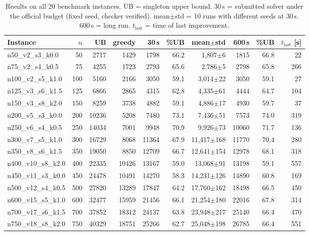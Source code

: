 \documentclass[10pt, a4paper]{article}
\begin{document}
\begin{table}[t]
\centering\footnotesize
\caption{Results on all 20 benchmark instances. UB = singleton upper bound.
30\,s = submitted solver under the official budget (fixed seed, checker
verified). mean$\pm$std = 10 runs with different seeds at 30\,s.
600\,s = long run. $t_{\text{last}}$ = time of last improvement.}
\label{tab:results}
\begin{tabular}{@{}lrrrrrrrrr@{}}
\toprule
Instance & $n$ & UB & greedy & 30\,s & \%UB & mean$\pm$std & 600\,s & \%UB & $t_{\text{last}}$ [s] \\
\midrule
n50\_v2\_s3\_k0.0    &   50 &  2717 &  1429 &  1798 & 66.2 & 1{,}807$\pm$6 &  1815 & 66.8 &  22 \\
n75\_v2\_s4\_k0.5    &   75 &  4255 &  1723 &  2793 & 65.6 & 2{,}786$\pm$5 &  2798 & 65.8 & 266 \\
n100\_v2\_s5\_k1.0   &  100 &  5160 &  2166 &  3050 & 59.1 & 3{,}014$\pm$22 &  3050 & 59.1 &  27 \\
n125\_v3\_s6\_k1.5   &  125 &  6866 &  2865 &  4315 & 62.8 & 4{,}335$\pm$61 &  4444 & 64.7 & 104 \\
n150\_v3\_s8\_k2.0   &  150 &  8259 &  3738 &  4882 & 59.1 & 4{,}886$\pm$17 &  4930 & 59.7 &  37 \\
n200\_v5\_s3\_k0.0   &  200 & 10236 &  5208 &  7480 & 73.1 & 7{,}436$\pm$51 &  7573 & 74.0 & 319 \\
n250\_v6\_s4\_k0.5   &  250 & 14034 &  7001 &  9948 & 70.9 & 9{,}926$\pm$73 & 10060 & 71.7 & 136 \\
n300\_v7\_s5\_k1.0   &  300 & 16729 &  8068 & 11364 & 67.9 & 11{,}417$\pm$168 & 11770 & 70.4 & 280 \\
n350\_v8\_s6\_k1.5   &  350 & 19050 &  8850 & 12709 & 66.7 & 12{,}641$\pm$154 & 12978 & 68.1 & 318 \\
n400\_v10\_s8\_k2.0  &  400 & 22335 & 10426 & 13167 & 59.0 & 13{,}068$\pm$91 & 13198 & 59.1 & 557 \\
n450\_v11\_s3\_k0.0  &  450 & 24478 & 10491 & 14270 & 58.3 & 14{,}231$\pm$126 & 14890 & 60.8 & 169 \\
n500\_v12\_s4\_k0.5  &  500 & 27820 & 13289 & 17847 & 64.2 & 17{,}760$\pm$162 & 18498 & 66.5 & 450 \\
n600\_v15\_s5\_k1.0  &  600 & 32477 & 15959 & 21456 & 66.1 & 21{,}254$\pm$180 & 22016 & 67.8 & 314 \\
n700\_v17\_s6\_k1.5  &  700 & 37852 & 18312 & 24137 & 63.8 & 23{,}948$\pm$217 & 25140 & 66.4 & 470 \\
n750\_v18\_s8\_k2.0  &  750 & 40329 & 18751 & 25266 & 62.7 & 25{,}048$\pm$198 & 26785 & 66.4 & 551 \\

\end{tabular}
\end{table}
\end{document}
